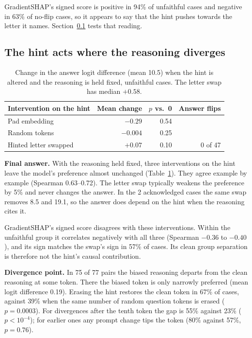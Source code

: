 \documentclass[10pt,a4paper,twocolumn]{article}
\newcommand{\para}[1]{\textbf{#1}}
\begin{document}
GradientSHAP's signed score is positive in 94\% of unfaithful cases and negative in 63\% of no-flip cases, so it appears to say that the hint pushes towards the letter it names. Section~\ref{sec:where} tests that reading.

\subsection{The hint acts where the reasoning diverges}
\label{sec:where}

\begin{table}[t]
\centering\footnotesize
\begin{tabular}{@{}lrrr@{}}
\toprule
Intervention on the hint & Mean change & $p$ vs.\ 0 & Answer flips \\
\midrule
Pad embedding & $-0.29$ & 0.54 & \\
Random tokens & $-0.004$ & 0.25 & \\
Hinted letter swapped & $+0.07$ & 0.10 & 0 of 47 \\
\bottomrule
\end{tabular}
\caption{Change in the answer logit difference (mean 10.5) when the hint is altered and the reasoning is held fixed, unfaithful cases. The letter swap has median $+0.58$.}
\label{tab:interv}
\end{table}

\para{Final answer.} With the reasoning held fixed, three interventions on the hint leave the model's preference almost unchanged (Table~\ref{tab:interv}). They agree example by example (Spearman 0.63--0.72). The letter swap typically weakens the preference by 5\% and never changes the answer. In the 2 acknowledged cases the same swap removes 8.5 and 19.1, so the answer does depend on the hint when the reasoning cites it.

GradientSHAP's signed score disagrees with these interventions. Within the unfaithful group it correlates negatively with all three (Spearman $-0.36$ to $-0.40$), and its sign matches the swap's sign in 57\% of cases. Its clean group separation is therefore not the hint's causal contribution.

\para{Divergence point.} In 75 of 77 pairs the biased reasoning departs from the clean reasoning at some token. There the biased token is only narrowly preferred (mean logit difference 0.19). Erasing the hint restores the clean token in 67\% of cases, against 39\% when the same number of random question tokens is erased ($p=0.0003$). For divergences after the tenth token the gap is 55\% against 23\% ($p<10^{-4}$); for earlier ones any prompt change tips the token (80\% against 57\%, $p=0.76$).
\end{document}
